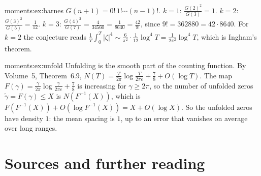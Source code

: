 \begin{solution}{moments:ex:barnes}
\idea $G(n+1)=0!\,1!\cdots(n-1)!$.
\writeup $k=1$: $\frac{G(2)^2}{G(3)}=1$. $k=2$: $\frac{G(3)^2}{G(5)}=\frac1{12}$. $k=3$: $\frac{G(4)^2}{G(7)}=\frac4{34560}=\frac1{8640}=\frac{42}{9!}$, since $9!=362880=42\cdot8640$.
For $k=2$ the conjecture reads $\frac1T\int_0^T|\zeta|^4\sim\frac6{\pi^2}\cdot\frac1{12}\log^4T=\frac1{2\pi^2}\log^4T$, which is Ingham's theorem.
\end{solution}

\begin{solution}{moments:ex:unfold}
\idea Unfolding is the smooth part of the counting function.
\writeup By Volume~5, Theorem~6.9, $N(T)=\frac T{2\pi}\log\frac T{2\pi e}+\frac78+O(\log T)$. The map $F(\gamma)=\frac\gamma{2\pi}\log\frac\gamma{2\pi e}+\frac78$ is increasing for $\gamma\ge2\pi$,
so the number of unfolded zeros $\tilde\gamma=F(\gamma)\le X$ is $N(F^{-1}(X))$, which is $F(F^{-1}(X))+O(\log F^{-1}(X))=X+O(\log X)$. So the unfolded zeros
have density $1$: the mean spacing is $1$, up to an error that vanishes on average over long ranges.
\end{solution}

\section*{Sources and further reading}

